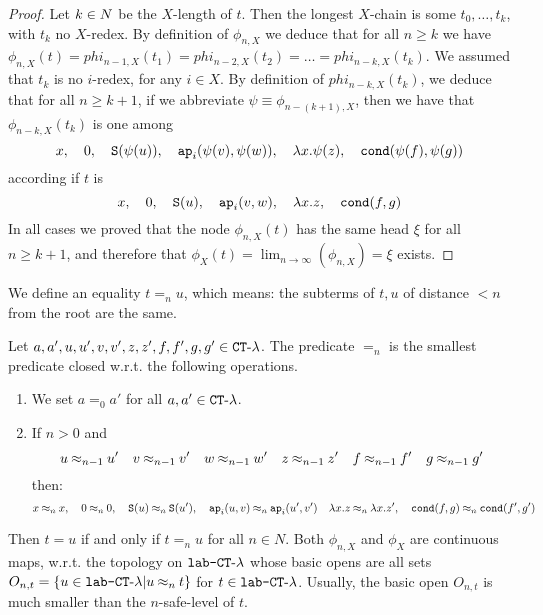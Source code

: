 \begin{proof}
Let $k\in {N}$ be the $X$-length of $t$. Then the longest $X$-chain is some $t_0, \ldots, t_k$,
with $t_k$ no $X$-redex.
By definition of $\phi_{n,X}$ we deduce that for all $n \ge k$ we have $\phi_{n,X}(t)
= phi_{n-1,X}(t_1) = phi_{n-2,X}(t_2) = \ldots = phi_{n-k,X}(t_k)$. 
We assumed that $t_k$ is no $i$-redex, for any $i \in X$.
By definition of $phi_{n-k,X}(t_k)$, 
we deduce that for all $n \ge k+1$, if we abbreviate $\psi \equiv \phi_{n-(k+1),X}$, then
we have that $\phi_{n-k,X}(t_k)$ is one among
$$ 
x, \ \ \  
0, \ \ \  
{\tt S}(\psi(u)),  \ \ \  
{\tt ap}_i(\psi(v), \psi(w)), \ \ \  
\lambda x.\psi(z), \ \ \  
{\tt cond}(\psi(f), \psi(g))
$$
according if $t$ is
$$ 
x, \ \ \  
0, \ \ \  
{\tt S}(u),  \ \ \  
{\tt ap}_i(v,w), \ \ \  
\lambda x.z, \ \ \  
{\tt cond}(f,g)
$$
In all cases we proved that the node $\phi_{n,X}(t)$ has the same head $\xi$ for all $n \ge k+1$,
and therefore that $\phi_X(t) = \lim_{n \rightarrow \infty}(\phi_{n,X}) = \xi$ exists.
\end{proof}


We define an equality $t =_n u$, which means: the subterms of $t,u$ of distance $<n$ from the root are the
same.

\begin{definition}[$n$-equality on Terms of $\CTlambda$]
Let $a,a',u,u',v,v',z,z',f,f',g,g' \in { {\tt CT}\mbox{-}\lambda}$. 
The predicate $=_n$ is the smallest predicate closed w.r.t. the following operations.

\begin{enumerate}


\item
We set
$a=_0 a'$ for all $a,a' \in { {\tt CT}\mbox{-}\lambda}$. 
\item
If $n>0$ and
$$
u\nequal{n-1} u' \ \ \ v\nequal{n-1} v' \ \ \ w\nequal{n-1} w' \ \ \ z\nequal{n-1} z' \ \ \ f\nequal{n-1} f' \ \ \ g\nequal{n-1} g'
$$
then:
$$
x\nequal{n} x, \ \ \  
0\nequal{n} 0, \ \ \   
\Succ(u)\nequal{n} \Succ(u'), \ \ \ 
\ap_i(u,v) \nequal{n} \ap_i(u',v') \ \ \  
\lambda x.z \nequal{n} \lambda x.z', \ \ \ 
\cond(f,g) \nequal{n} \cond(f',g')
$$

\end{enumerate}
\end{definition}

Then $t=u$ if and only if $t=_n u$ for all $n \in N$.
Both $\phi_{n,X}$ and $\phi_X$ are continuous maps, w.r.t. the topology on ${\mbox{\tt lab-}{ {\tt CT}\mbox{-}\lambda}}$
whose basic opens are all sets 
$O_{n,t} = \{u \in {\mbox{\tt lab-} { {\tt CT}\mbox{-}\lambda} } | u \mathbin{\approx_{n}} t\}$  for $t \in {\mbox{\tt lab-} { {\tt CT}\mbox{-}\lambda} }$.
Usually,  the basic open $O_{n,t}$ is much smaller than the $n$-safe-level of $t$. 

